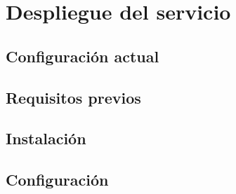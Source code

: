 \section{Despliegue del servicio}
\subsection{Configuración actual}
\subsection{Requisitos previos}

\subsection{Instalación}


\subsection{Configuración}
